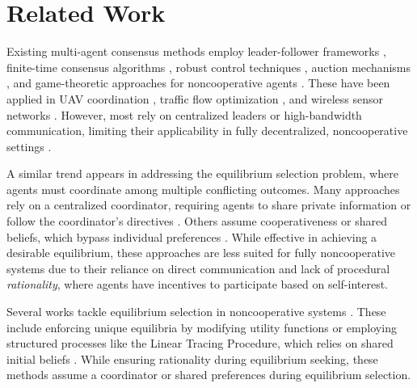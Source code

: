\section{Related Work}
Existing multi-agent consensus methods employ leader-follower frameworks \cite{consensus_leader_follow1,consensus_leader_follow2}, finite-time consensus algorithms \cite{consensus_finite1,consensus_finite2}, robust control techniques \cite{consensus_robust1}, auction mechanisms \cite{consensus_auction}, and game-theoretic approaches for noncooperative agents \cite{corrEq}. These have been applied in UAV coordination \cite{consensus_formation1, consensus_formation2, consensus_formation3}, traffic flow optimization \cite{corrEq}, and wireless sensor networks \cite{consensus_wireless1}. However, most rely on centralized leaders or high-bandwidth communication, limiting their applicability in fully decentralized, noncooperative settings \cite{consensus_review}.

A similar trend appears in addressing the equilibrium selection problem, where agents must coordinate among multiple conflicting outcomes. Many approaches rely on a centralized coordinator, requiring agents to share private information or follow the coordinator's directives \cite{Coop_1_monotone, Coop_2_potential, Coop_3_hetero, Coop_4_comm_priv, Coop_5_comm_priv, Coop_6, Coop_7_comm_priv, Coop_8, Coop_9}. Others assume cooperativeness or shared beliefs, which bypass individual preferences \cite{nonCoop_4_linear, nonCoop_5_linear, nonCoop_2_shared, nonCoop_1_coord}. While effective in achieving a desirable equilibrium, these approaches are less suited for fully noncooperative systems due to their reliance on direct communication and lack of procedural \emph{rationality}, where agents have incentives to participate based on self-interest.

Several works tackle equilibrium selection in noncooperative systems \cite{nonCoop_1_coord, nonCoop_2_shared, nonCoop_3_enforce, nonCoop_4_linear, nonCoop_5_linear, findNash_1, findNash_2}. These include enforcing unique equilibria by modifying utility functions \cite{nonCoop_3_enforce} or employing structured processes like the Linear Tracing Procedure, which relies on shared initial beliefs \cite{nonCoop_4_linear, nonCoop_5_linear}. While ensuring rationality during equilibrium seeking, these methods assume a coordinator or shared preferences during equilibrium selection.

